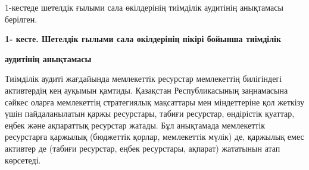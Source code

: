 1-кестеде шетелдік ғылыми сала өкілдерінің тиімділік аудитінің
анықтамасы берілген.

{\bfseries 1- кесте. Шетелдік ғылыми сала өкілдерінің пікірі бойынша
тиімділік}

{\bfseries аудитінің анықтамасы}


Тиімділік аудиті жағдайында мемлекеттік ресурстар мемлекеттің
билігіндегі активтердің кең ауқымын қамтиды. Қазақстан Республикасының
заңнамасына сәйкес оларға мемлекеттің стратегиялық мақсаттары мен
міндеттеріне қол жеткізу үшін пайдаланылатын қаржы ресурстары, табиғи
ресурстар, өндірістік қуаттар, еңбек және ақпараттық ресурстар жатады.
Бұл анықтамада мемлекеттік ресурстарға қаржылық (бюджеттік қорлар,
мемлекеттік мүлік) де, қаржылық емес активтер де (табиғи ресурстар,
еңбек ресурстары, ақпарат) жататынын атап көрсетеді.

